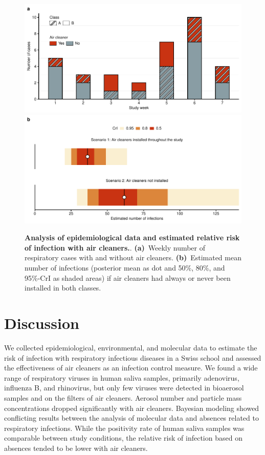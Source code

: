 \documentclass[fleqn,11pt]{wlscirep}
\begin{document}
\begin{figure}[!htpb]
    \includegraphics[width=\linewidth]{../../results/epi-data/cases_by_week.pdf} 
    \includegraphics[width=\linewidth]{../../results/epi-data/avoided-infections.pdf}
    \caption{\textbf{Analysis of epidemiological data and estimated relative risk of infection with air cleaners.}. \textbf{(a)}~Weekly number of respiratory cases with and without air cleaners. \textbf{(b)}~Estimated mean number of infections (posterior mean as dot and 50\%, 80\%, and 95\%-CrI as shaded areas) if air cleaners had always or never been installed in both classes.}
    \label{fig:redcap-results}
\end{figure}


\FloatBarrier

\newpage

\section{Discussion}


We collected epidemiological, environmental, and molecular data to estimate the risk of infection with respiratory infectious diseases in a Swiss school and assessed the effectiveness of air cleaners as an infection control measure. We found a wide range of respiratory viruses in human saliva samples, primarily adenovirus, influenza B, and rhinovirus, but only few viruses were detected in bioaerosol samples and on the filters of air cleaners. Aerosol number and particle mass concentrations dropped significantly with air cleaners. Bayesian modeling showed conflicting results between the analysis of molecular data and absences related to respiratory infections. While the positivity rate of human saliva samples was comparable between study conditions, the relative risk of infection based on absences tended to be lower with air cleaners.
\end{document}
